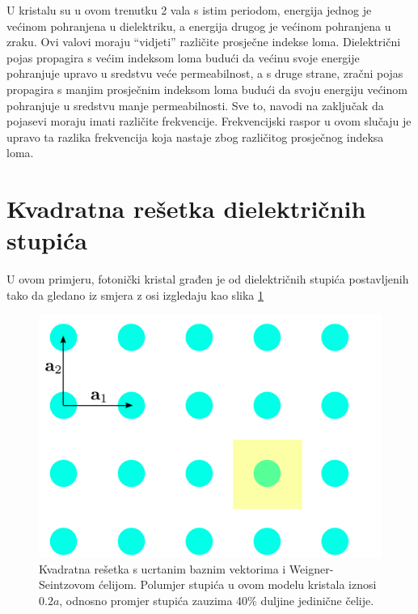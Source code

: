 \documentclass[utf8, seminar]{fer}
\begin{document}
U kristalu su u ovom trenutku 2 vala s istim periodom, energija jednog je
većinom pohranjena u dielektriku, a energija drugog je većinom pohranjena
u zraku. Ovi valovi moraju ``vidjeti'' različite prosječne indekse loma.
Dielektrični pojas propagira s većim indeksom loma budući da većinu svoje energije
pohranjuje upravo u sredstvu veće permeabilnost, a s druge strane, zračni pojas
propagira s manjim prosječnim indeksom loma budući da svoju energiju
većinom pohranjuje u sredstvu manje permeabilnosti. Sve to, navodi na zaključak
da pojasevi moraju imati različite frekvencije. Frekvencijski raspor u ovom
slučaju je upravo ta razlika frekvencija koja nastaje zbog različitog prosječnog
indeksa loma.

\FloatBarrier


\section{Kvadratna rešetka dielektričnih stupića}

U ovom primjeru, fotonički kristal građen je od dielektričnih stupića
postavljenih tako da gledano iz smjera z osi izgledaju kao slika
\ref{fig:square_lattice}

\begin{figure}[ht]
	\centering
	\includegraphics[width = 1.0\linewidth]{./images/square_lattice.pdf}
	\caption{Kvadratna rešetka s ucrtanim baznim vektorima i Weigner-Seintzovom
	ćelijom. Polumjer stupića u ovom modelu kristala iznosi ${0.2 a}$, odnosno
	promjer stupića zauzima 40\% duljine jedinične čelije.}
	\label{fig:square_lattice}
\end{figure}
\end{document}
